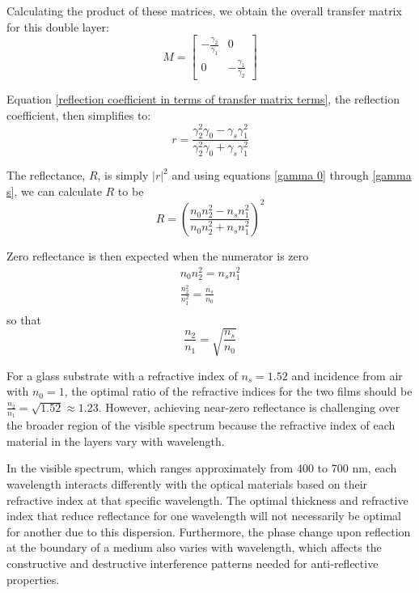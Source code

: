 Calculating the product of these matrices, we obtain the overall transfer matrix for this double layer:
\[
M = 
    \begin{bmatrix}
        -\frac{\gamma_2}{\gamma_1} & 0 \\
        0 & -\frac{\gamma_1}{\gamma_2}
    \end{bmatrix}
\]


Equation \ref{reflection coefficient in terms of transfer matrix terms}, the reflection coefficient, then simplifies to:
    \begin{equation}\label{reflection coefficient for 2-layer antireflecting films}
    r = \frac{\gamma_2^2\gamma_0 - \gamma_s\gamma_1^2}{\gamma_2^2\gamma_0 + \gamma_s\gamma_1^2}
    \end{equation}

The reflectance, $R$, is simply $|r|^2$ and using equations \ref{gamma 0} through \ref{gamma s}, we can calculate $R$ to be
    \begin{equation}\label{reflectance for 2-layer antireflecting films}
    R = \left(\frac{n_0n_2^2 - n_sn_1^2}{n_0n_2^2 + n_sn_1^2}\right)^2
    \end{equation}

Zero reflectance is then expected when the numerator is zero
    \begin{align*}
        n_0n_2^2 = n_sn_1^2 \\
        \frac{n_2^2}{n_1^2} = \frac{n_s}{n_0}  \\
    \end{align*} so that
    \begin{equation}\label{zero reflectance criterion}
    \frac{n_2}{n_1} = \sqrt{\frac{n_s}{n_0}}
    \end{equation}

For a glass substrate with a refractive index of $n_s = 1.52$ and incidence from air with $n_0 = 1$, the optimal ratio of the refractive indices for the two films should be $\frac{n_2}{n_1} = \sqrt{1.52} \approx 1.23$. However, achieving near-zero reflectance is challenging over the broader region of the visible spectrum because the refractive index of each material in the layers vary with wavelength.

In the visible spectrum, which ranges approximately from 400 to 700 nm, each wavelength interacts differently with the optical materials based on their refractive index at that specific wavelength. The optimal thickness and refractive index that reduce reflectance for one wavelength will not necessarily be optimal for another due to this dispersion. Furthermore, the phase change upon reflection at the boundary of a medium also varies with wavelength, which affects the constructive and destructive interference patterns needed for anti-reflective properties.

